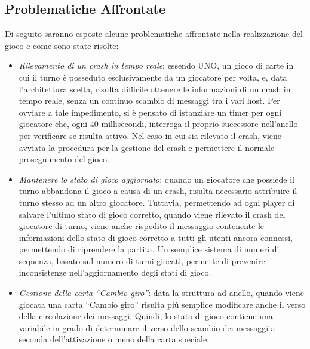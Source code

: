 \documentclass[11pt]{article} %
\begin{document}
\subsection{Problematiche Affrontate}
Di seguito saranno esposte alcune problematiche affrontate nella realizzazione del gioco e come sono state risolte:
\begin{itemize}
  \item \emph{Rilevamento di un crash in tempo reale}: essendo UNO, un gioco di carte in cui il turno è posseduto esclusivamente da un giocatore per volta, e,
  data l'architettura scelta, risulta difficile ottenere le informazioni di un crash in tempo reale, senza un continuo scambio di messaggi tra i vari host.
  Per ovviare a tale impedimento, si è pensato di istanziare un timer per ogni giocatore che, ogni 40 millisecondi, interroga il proprio successore nell'anello
  per verificare se risulta attivo. Nel caso in cui sia rilevato il crash, viene avviata la procedura per la gestione del crash e permettere il normale 
  proseguimento del gioco.
  \item \emph{Mantenere lo stato di gioco aggiornato}: quando un giocatore che possiede il turno abbandona il gioco a causa di un crash, risulta necessario attribuire il turno stesso ad un altro giocatore. Tuttavia, permettendo ad ogni player di salvare l'ultimo stato di gioco corretto, quando viene rilevato il crash del 
  giocatore di turno, viene anche rispedito il messaggio contenente le informazioni dello stato di gioco corretto a tutti gli utenti ancora connessi, permettendo di riprendere la partita. Un semplice sistema di numeri di sequenza, basato sul numero di turni giocati, permette di prevenire inconsistenze nell'aggiornamento degli stati di gioco.
  \item \emph{Gestione della carta ``Cambio giro''}: data la struttura ad anello, quando viene giocata una carta ``Cambio giro'' risulta più semplice modificare
  anche il verso della circolazione dei messaggi. Quindi, lo stato di gioco contiene una variabile in grado di determinare il verso dello scambio dei messaggi
  a seconda dell'attivazione o meno della carta speciale.
\end{itemize}
\end{document}
